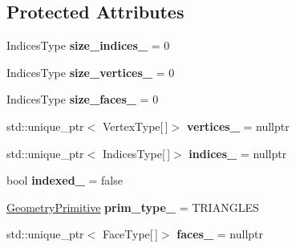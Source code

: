 \subsection*{Protected Attributes}
\begin{DoxyCompactItemize}
\item 
\hypertarget{classs9_1_1GeometryT_a10b48b6234990345813be8f2bba06f5b}{Indices\-Type {\bfseries size\-\_\-indices\-\_\-} = 0}\label{classs9_1_1GeometryT_a10b48b6234990345813be8f2bba06f5b}

\item 
\hypertarget{classs9_1_1GeometryT_a5c8c77b4471c67dc0724aac81a48e1ed}{Indices\-Type {\bfseries size\-\_\-vertices\-\_\-} = 0}\label{classs9_1_1GeometryT_a5c8c77b4471c67dc0724aac81a48e1ed}

\item 
\hypertarget{classs9_1_1GeometryT_accd218b227dec0ac31e9f67c19a20134}{Indices\-Type {\bfseries size\-\_\-faces\-\_\-} = 0}\label{classs9_1_1GeometryT_accd218b227dec0ac31e9f67c19a20134}

\item 
\hypertarget{classs9_1_1GeometryT_a8e5406e46993016893e3052614d291e4}{std\-::unique\-\_\-ptr$<$ Vertex\-Type\mbox{[}$\,$\mbox{]}$>$ {\bfseries vertices\-\_\-} = nullptr}\label{classs9_1_1GeometryT_a8e5406e46993016893e3052614d291e4}

\item 
\hypertarget{classs9_1_1GeometryT_a99d11cc160942e577030647b550a330d}{std\-::unique\-\_\-ptr$<$ Indices\-Type\mbox{[}$\,$\mbox{]}$>$ {\bfseries indices\-\_\-} = nullptr}\label{classs9_1_1GeometryT_a99d11cc160942e577030647b550a330d}

\item 
\hypertarget{classs9_1_1GeometryT_ac75a7c8e606158d28a0b515422cec893}{bool {\bfseries indexed\-\_\-} = false}\label{classs9_1_1GeometryT_ac75a7c8e606158d28a0b515422cec893}

\item 
\hypertarget{classs9_1_1GeometryT_af914c304f37ae7d4ac03da66e0c63bb8}{\hyperlink{namespaces9_ad57d1332f8fd67d23f6a1d3520ab785c}{Geometry\-Primitive} {\bfseries prim\-\_\-type\-\_\-} = T\-R\-I\-A\-N\-G\-L\-E\-S}\label{classs9_1_1GeometryT_af914c304f37ae7d4ac03da66e0c63bb8}

\item 
\hypertarget{classs9_1_1GeometryT_a4997414fb135d25c66717fdd551467b7}{std\-::unique\-\_\-ptr$<$ Face\-Type\mbox{[}$\,$\mbox{]}$>$ {\bfseries faces\-\_\-} = nullptr}\label{classs9_1_1GeometryT_a4997414fb135d25c66717fdd551467b7}

\end{DoxyCompactItemize}


